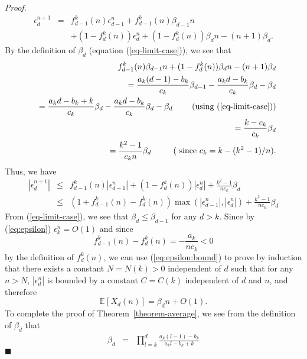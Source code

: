 \documentclass[11pt]{article}
\providecommand{\expectation}[2]{\mathbb{E}_{#2}\left[#1\right]}
\newenvironment{proof}[0]{\textit{Proof.} }{\hfill  $\blacksquare$ }
\providecommand{\vcprob}[3]{f^{#1}_{#2}(#3)}
\providecommand{\tdeg}[2]{X_{#1}(#2)}
\providecommand{\edeg}[2]{\expectation{\tdeg{#1}{#2}}{}}
\begin{document}
\begin{proof}
\begin{eqnarray}
\epsilon_d^{n + 1} &=&  \vcprob{k}{d - 1}{n}\epsilon_{d - 1}^{n} + \vcprob{k}{d - 1}{n}\beta_{d - 1}n  \nonumber \\
                     \ \ \ \ \ \ \ \ \, \,  & & + (1 - \vcprob{k}{d}{n})\epsilon_{d}^{n} + (1 - \vcprob{k}{d}{n}) \beta_{d}n - (n+1)\beta_{d}.
\end{eqnarray}
By the definition of $\beta_d$ (equation (\ref{eq-limit-case})), we see that
\begin{eqnarray*}
 &&\vcprob{k}{d - 1}{n}\beta_{d - 1}n + (1 - \vcprob{k}{d}{n}) \beta_{d}n - (n+1)\beta_{d} \\
 && = \frac{a_k(d - 1) - b_k}{c_k}\beta_{d - 1} - \frac{a_kd - b_k}{c_k}\beta_d - \beta_d \\
  && = \frac{a_kd - b_k + k}{c_k}\beta_d - \frac{a_kd - b_k}{c_k}\beta_d - \beta_d  \ \ \ \ \ \ \ (\textrm{using (\ref{eq-limit-case}))}\\
  && = \frac{k - c_k}{c_k}\beta_d  \\
  && = \frac{k^2 - 1}{c_kn}\beta_d \ \ \ \ \ \ \ \ (\textrm{ since } c_k = k - (k^2 - 1)/n).
\end{eqnarray*}
Thus, we have
\begin{eqnarray}
\label{eq:epsilon:bound}
|\epsilon_d^{n + 1}| &\leq& \vcprob{k}{d - 1}{n} |\epsilon_{d - 1}^{n}| + (1 - \vcprob{k}{d}{n})|\epsilon_d^{n}|
                           + \frac{k^2 - 1}{nc_k} \beta_{d} \nonumber \\
                  &\leq& (1 + \vcprob{k}{d - 1}{n} - \vcprob{k}{d}{n}) \max(|\epsilon_{d - 1}^{n}|, |\epsilon_d^{n}|)
                    + \frac{k^2 - 1}{nc_k} \beta_{d}
\end{eqnarray}
From (\ref{eq-limit-case}), we see that $\beta_d \leq \beta_{d - 1}$ for any $d > k$.
Since  by (\ref{eq:epsilon}) $\epsilon_k^{n}  =  O(1)$ and since 
$$
\vcprob{k}{d - 1}{n} - \vcprob{k}{d}{n} = -\frac{a_k}{nc_k} < 0
$$
by the definition of  $\vcprob{k}{d}{n}$, we can use (\ref{eq:epsilon:bound}) to prove by induction
 that there exists a constant $N = N(k) > 0$ independent of $d$ such that for any $n > N$,
$|\epsilon_{d}^n|$ is bounded by a constant $C = C(k)$ independent of $d$ and $n$, and therefore
\begin{equation}
\label{eq-claim}
  \edeg{d}{n} = \beta_d n + O(1).
\end{equation} 
To complete the proof of Theorem~\ref{theorem-average},
we see from the definition of $\beta_d$ that
\begin{eqnarray}
\beta_d &=& \prod\limits_{l = k}^{d}\frac{a_k(l - 1) - b_k}{a_kl - b_k + k}

\end{eqnarray}
\end{proof}
\end{document}
